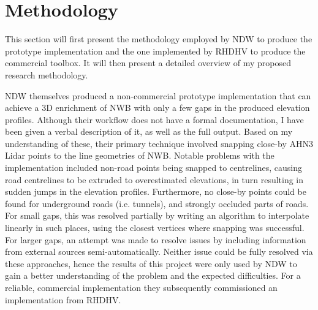 
\section{Methodology}
\label{sec:m}

This section will first present the methodology employed by NDW to produce the prototype implementation and the one implemented by RHDHV to produce the commercial toolbox. It will then present a detailed overview of my proposed research methodology.

NDW themselves produced a non-commercial prototype implementation that can achieve a 3D enrichment of NWB with only a few gaps in the produced elevation profiles. Although their workflow does not have a formal documentation, I have been given a verbal description of it, as well as the full output. Based on my understanding of these, their primary technique involved snapping close-by AHN3 Lidar points to the line geometries of NWB. Notable problems with the implementation included non-road points being snapped to centrelines, causing road centrelines to be extruded to overestimated elevations, in turn resulting in sudden jumps in the elevation profiles. Furthermore, no close-by points could be found for underground roads (i.e. tunnels), and strongly occluded parts of roads. For small gaps, this was resolved partially by writing an algorithm to interpolate linearly in such places, using the closest vertices where snapping was successful. For larger gaps, an attempt was made to resolve issues by including information from external sources semi-automatically. Neither issue could be fully resolved via these approaches, hence the results of this project were only used by NDW to gain a better understanding of the problem and the expected difficulties. For a reliable, commercial implementation they subsequently commissioned an implementation from RHDHV.

